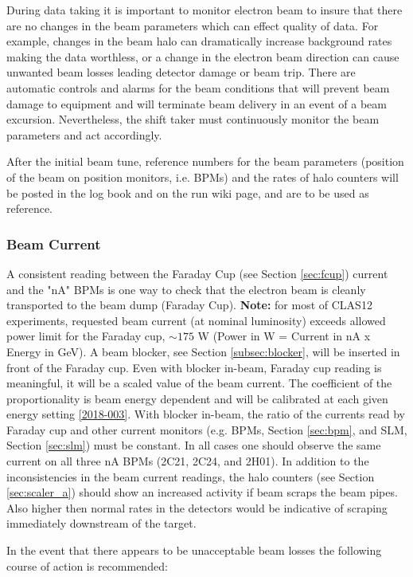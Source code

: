 \documentclass[12pt]{article}
\begin{document}
During data taking it is important to monitor electron beam
to insure that there are no changes in the beam parameters which can effect quality of data. For
example, changes in the beam halo can dramatically increase background rates
making the data worthless, or a change in the electron beam direction can cause
unwanted beam losses leading detector damage or beam trip. There are
automatic controls and alarms for the beam conditions that will prevent beam damage to equipment 
and will terminate beam delivery in an event of a beam excursion. Nevertheless,  the shift taker must
continuously monitor the beam parameters and act accordingly.

After the initial beam tune, reference numbers for the beam parameters (position of the beam on position monitors, i.e. BPMs) and the rates of halo counters will be posted in the log book and on the run wiki page, and are to be used as reference. 

\subsubsection{Beam Current}
\indent

A consistent reading between the Faraday Cup (see Section \ref{sec:fcup}) current
and the "nA" BPMs is one way
to check that the electron beam is cleanly transported to the beam dump (Faraday Cup). {\bf Note:} for most of CLAS12 experiments, requested beam current (at nominal luminosity) exceeds allowed power limit for the Faraday cup, $\sim 175$ W (Power in W = Current in nA x Energy in GeV). A beam blocker, see Section \ref{subsec:blocker}, will be inserted in front of the Faraday cup. Even with blocker in-beam, Faraday cup reading is meaningful, it will be a scaled value of the beam current. The coefficient of the proportionality is beam energy dependent \cite{blocker} and will be calibrated at each given energy setting \ref{2018-003}. With blocker in-beam, the ratio of the currents read by Faraday cup and other current monitors (e.g. BPMs, Section \ref{sec:bpm}, and SLM, Section \ref{sec:slm}) must be constant. In all cases one should observe the same current on all three nA BPMs (2C21, 2C24, and 2H01). In addition to the inconsistencies in the beam current readings, the halo counters (see Section \ref{sec:scaler_a}) should
show an increased activity if beam scraps the beam pipes. Also higher then normal rates in the detectors would be indicative
of scraping immediately downstream of the target.

In the event that there appears to be unacceptable beam losses the following course of action is recommended:
\end{document}
